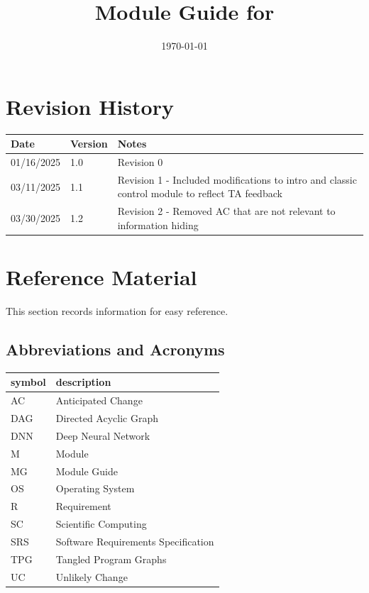 \documentclass[12pt, titlepage]{article}
\begin{document}
\title{Module Guide for \progname{}} 
\author{\authname}
\date{\today}

\maketitle


\section{Revision History}

\begin{tabularx}{\textwidth}{p{3cm}p{2cm}X}
\toprule {\bf Date} & {\bf Version} & {\bf Notes}\\
\midrule
01/16/2025 & 1.0 & Revision 0\\
03/11/2025 & 1.1 & Revision 1 - Included  modifications to intro and classic control module to reflect TA feedback\\
03/30/2025 & 1.2 & Revision 2 - Removed AC that are not relevant to information hiding\\
\bottomrule
\end{tabularx}

\newpage

\section{Reference Material}

This section records information for easy reference.

\subsection{Abbreviations and Acronyms}

\renewcommand{\arraystretch}{1.2}
\begin{tabular}{l l} 
  \toprule		
  \textbf{symbol} & \textbf{description}\\
  \midrule 
  AC & Anticipated Change\\
  DAG & Directed Acyclic Graph \\
  DNN & Deep Neural Network \\
  M & Module \\
  MG & Module Guide \\
  OS & Operating System \\
  R & Requirement\\
  SC & Scientific Computing \\
  SRS & Software Requirements Specification\\
  TPG & Tangled Program Graphs\\
  UC & Unlikely Change \\
  \bottomrule
\end{tabular}\\
\end{document}
